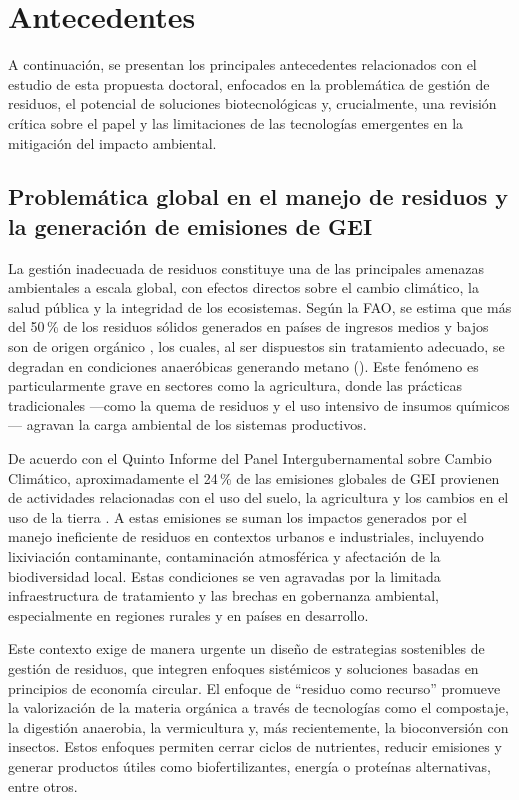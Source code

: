 \chapter{Antecedentes}

A continuación, se presentan los principales antecedentes relacionados con el estudio de esta propuesta doctoral, enfocados en la problemática de gestión de residuos, el potencial de soluciones biotecnológicas y, crucialmente, una revisión crítica sobre el papel y las limitaciones de las tecnologías emergentes en la mitigación del impacto ambiental.

\section{Problemática global en el manejo de residuos y la generación de emisiones de GEI}

La gestión inadecuada de residuos constituye una de las principales amenazas ambientales a escala global, con efectos directos sobre el cambio climático, la salud pública y la integridad de los ecosistemas. Según la FAO, se estima que más del 50\,\% de los residuos sólidos generados en países de ingresos medios y bajos son de origen orgánico \parencite{FAO2021}, los cuales, al ser dispuestos sin tratamiento adecuado, se degradan en condiciones anaeróbicas generando metano (). Este fenómeno es particularmente grave en sectores como la agricultura, donde las prácticas tradicionales —como la quema de residuos y el uso intensivo de insumos químicos— agravan la carga ambiental de los sistemas productivos.

De acuerdo con el Quinto Informe del Panel Intergubernamental sobre Cambio Climático, aproximadamente el 24\,\% de las emisiones globales de GEI provienen de actividades relacionadas con el uso del suelo, la agricultura y los cambios en el uso de la tierra \parencite{groupedexpertsintergouvernementalsurlevolutionduclimatClimateChange20142014}. A estas emisiones se suman los impactos generados por el manejo ineficiente de residuos en contextos urbanos e industriales, incluyendo lixiviación contaminante, contaminación atmosférica y afectación de la biodiversidad local. Estas condiciones se ven agravadas por la limitada infraestructura de tratamiento y las brechas en gobernanza ambiental, especialmente en regiones rurales y en países en desarrollo.

Este contexto exige de manera urgente un diseño de estrategias sostenibles de gestión de residuos, que integren enfoques sistémicos y soluciones basadas en principios de economía circular. El enfoque de “residuo como recurso” promueve la valorización de la materia orgánica a través de tecnologías como el compostaje, la digestión anaerobia, la vermicultura y, más recientemente, la bioconversión con insectos. Estos enfoques permiten cerrar ciclos de nutrientes, reducir emisiones y generar productos útiles como biofertilizantes, energía o proteínas alternativas, entre otros.

